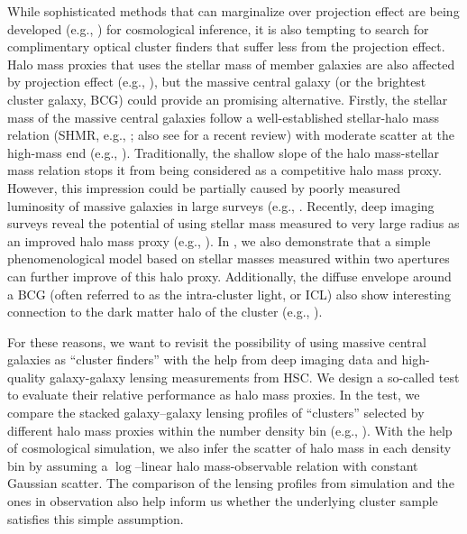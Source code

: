 \documentclass[fleqn,usenatbib,useAMS,english]{mnras}
\begin{document}
    While sophisticated methods that can marginalize over projection effect are being developed
    (e.g., \citealt{To2021a}) for cosmological inference, it is also tempting to search for
    complimentary optical cluster finders that suffer less from the projection effect.
    Halo mass proxies that uses the stellar mass of member galaxies are also affected
    by projection effect (e.g., \citealt{Palmese2020, Bradshaw2020}), but the massive central
    galaxy (or the brightest cluster galaxy, BCG) could provide an promising alternative.
    Firstly, the stellar mass of the massive central galaxies follow a 
    well-established stellar-halo 
    mass relation (SHMR, e.g., \citealt{Leauthaud2012, Tinker2017, Kravtsov2018}; also see
    \citealt{Wechsler2018} for a recent review) with moderate scatter at the high-mass end (e.g.,
    \citealt{More2009, Leauthaud2012, Reddick2013, Zu2015, Lehmann2017, Kravtsov2018}).
    Traditionally, the shallow slope of the halo mass-stellar mass relation stops 
    it from being considered as a competitive halo mass proxy.
    However, this impression could be partially caused by poorly measured luminosity of massive 
    galaxies in large surveys (e.g., \citealt{Bernardi2013, Huang2018b}.
    Recently, deep imaging surveys reveal the potential of using stellar mass measured to very
    large radius as an improved halo mass proxy (e.g., \citealt{Huang2018c, SampaioSantos2021}).
    In \citet{Huang2020}, we also demonstrate that a simple phenomenological model based on
    stellar masses measured within two apertures can further improve of this halo proxy.
    Additionally, the diffuse envelope around a BCG (often referred to as the intra-cluster
    light, or ICL) also show interesting connection to the dark matter halo of the cluster
    (e.g., \citealt{Montes2018, Montes2019, Zhang2019b, Furnell2021}).
    
    For these reasons, we want to revisit the possibility of using massive central galaxies 
    as ``cluster finders'' with the help from deep imaging data and high-quality galaxy-galaxy 
    lensing measurements from HSC.
    We design a so-called \topn{} test to evaluate their relative performance as halo mass proxies.
    In the \topn{} test, we compare the stacked galaxy--galaxy lensing profiles
    of ``clusters'' selected by different halo mass proxies within the number density bin
    (e.g., \citealt{Reyes2008}).
    With the help of cosmological simulation, we also infer the scatter of halo mass in each density
    bin by assuming a $\log$--linear halo mass-observable relation with constant Gaussian 
    scatter.
    The comparison of the lensing profiles from simulation and the ones in observation also help
    inform us whether the underlying cluster sample satisfies this simple assumption. 
    
\end{document}
